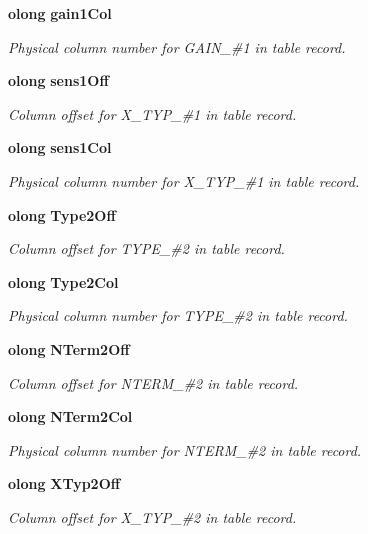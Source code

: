 \begin{CompactItemize}
{\bf olong} {\bf gain1Col}
\begin{CompactList}\small\item\em Physical column number for GAIN\_\-\#1 in table record. \item\end{CompactList}\item 
{\bf olong} {\bf sens1Off}
\begin{CompactList}\small\item\em Column offset for X\_\-TYP\_\-\#1 in table record. \item\end{CompactList}\item 
{\bf olong} {\bf sens1Col}
\begin{CompactList}\small\item\em Physical column number for X\_\-TYP\_\-\#1 in table record. \item\end{CompactList}\item 
{\bf olong} {\bf Type2Off}
\begin{CompactList}\small\item\em Column offset for TYPE\_\-\#2 in table record. \item\end{CompactList}\item 
{\bf olong} {\bf Type2Col}
\begin{CompactList}\small\item\em Physical column number for TYPE\_\-\#2 in table record. \item\end{CompactList}\item 
{\bf olong} {\bf NTerm2Off}
\begin{CompactList}\small\item\em Column offset for NTERM\_\-\#2 in table record. \item\end{CompactList}\item 
{\bf olong} {\bf NTerm2Col}
\begin{CompactList}\small\item\em Physical column number for NTERM\_\-\#2 in table record. \item\end{CompactList}\item 
{\bf olong} {\bf XTyp2Off}
\begin{CompactList}\small\item\em Column offset for X\_\-TYP\_\-\#2 in table record. \item\end{CompactList}\item 

\end{CompactItemize}
